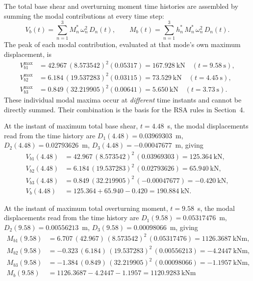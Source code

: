 \documentclass[11pt,a4paper]{article}
\begin{document}
The total base shear and overturning moment time histories are assembled by summing the modal contributions at every time step:
\begin{equation}
V_b(t)=\sum_{n=1}^{3}M_n^*\,\omega_n^2\,D_n(t),
\qquad
M_b(t)=\sum_{n=1}^{3}h_n^*\,M_n^*\,\omega_n^2\,D_n(t).
\end{equation}
The peak of each modal contribution, evaluated at that mode's own maximum displacement, is
\begin{align}
V_{b1}^{\max} &= 42.967\,(8.573542)^2(0.05317)
              = 167.928\ \mathrm{kN} \quad (t=9.58\ \mathrm{s}),\\
V_{b2}^{\max} &= 6.184\,(19.537283)^2(0.03115)
              = 73.529\ \mathrm{kN}  \quad (t=4.45\ \mathrm{s}),\\
V_{b3}^{\max} &= 0.849\,(32.219905)^2(0.00641)
              = 5.650\ \mathrm{kN}   \quad (t=3.73\ \mathrm{s}).
\end{align}
These individual modal maxima occur at \emph{different} time instants and cannot be directly summed. Their combination is the basis for the RSA rules in Section~4.

At the instant of maximum total base shear, $t = 4.48$~s, the modal displacements read from the time history are
$D_1(4.48) = 0.03969303$~m,
$D_2(4.48) = 0.02793626$~m,
$D_3(4.48) = -0.00047677$~m,
giving
\begin{align}
V_{b1}(4.48) &= 42.967\,(8.573542)^2\,(0.03969303)
             = 125.364\ \mathrm{kN},\\
V_{b2}(4.48) &= 6.184\,(19.537283)^2\,(0.02793626)
             = 65.940\ \mathrm{kN},\\
V_{b3}(4.48) &= 0.849\,(32.219905)^2\,(-0.00047677)
             = -0.420\ \mathrm{kN},\\
V_b(4.48)   &= 125.364 + 65.940 - 0.420
             = 190.884\ \mathrm{kN}.
\end{align}

At the instant of maximum total overturning moment, $t = 9.58$~s, the modal displacements read from the time history are
$D_1(9.58) = 0.05317476$~m,
$D_2(9.58) = 0.00556213$~m,
$D_3(9.58) = 0.00098066$~m,
giving
\begin{align}
M_{b1}(9.58) &= 6.707\,(42.967)\,(8.573542)^2\,(0.05317476)
             = 1126.3687\ \mathrm{kNm},\\
M_{b2}(9.58) &= -0.323\,(6.184)\,(19.537283)^2\,(0.00556213)
             = -4.2447\ \mathrm{kNm},\\
M_{b3}(9.58) &= -1.384\,(0.849)\,(32.219905)^2\,(0.00098066)
             = -1.1957\ \mathrm{kNm},\\
M_b(9.58)   &= 1126.3687 - 4.2447 - 1.1957
             = 1120.9283\ \mathrm{kNm}
\end{align}
\end{document}
